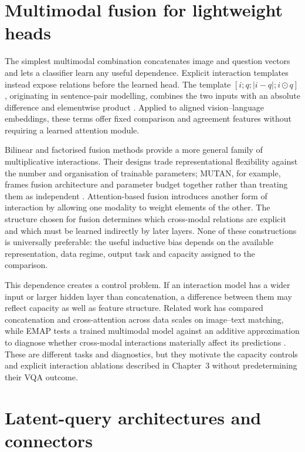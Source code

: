 \section{Multimodal fusion for lightweight heads}
\label{sec:ch2-fusion}

The simplest multimodal combination concatenates image and question vectors and lets a classifier learn any useful dependence. Explicit interaction templates instead expose relations before the learned head. The template $[i;q;\lvert i-q\rvert;i\odot q]$, originating in sentence-pair modelling, combines the two inputs with an absolute difference and elementwise product \citep{conneau2017infersent}. Applied to aligned vision--language embeddings, these terms offer fixed comparison and agreement features without requiring a learned attention module.

Bilinear and factorised fusion methods provide a more general family of multiplicative interactions. Their designs trade representational flexibility against the number and organisation of trainable parameters; MUTAN, for example, frames fusion architecture and parameter budget together rather than treating them as independent \citep{benyounes2017mutan}. Attention-based fusion introduces another form of interaction by allowing one modality to weight elements of the other. The structure chosen for fusion determines which cross-modal relations are explicit and which must be learned indirectly by later layers. None of these constructions is universally preferable: the useful inductive bias depends on the available representation, data regime, output task and capacity assigned to the comparison.

This dependence creates a control problem. If an interaction model has a wider input or larger hidden layer than concatenation, a difference between them may reflect capacity as well as feature structure. Related work has compared concatenation and cross-attention across data scales on image--text matching, while EMAP tests a trained multimodal model against an additive approximation to diagnose whether cross-modal interactions materially affect its predictions \citep{zhou2026alignment,hessel2020emap}. These are different tasks and diagnostics, but they motivate the capacity controls and explicit interaction ablations described in Chapter~3 without predetermining their VQA outcome.

\section{Latent-query architectures and connectors}
\label{sec:ch2-latent}

